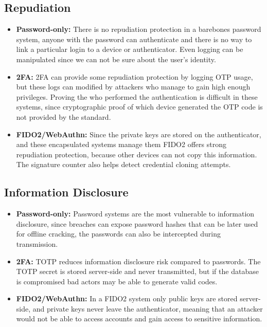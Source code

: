 {\subsection{Repudiation}
\begin{itemize}[itemsep=0pt, parsep=0pt]
    \item \textbf{Password-only:} There is no repudiation protection in a barebones password system, anyone with the password can authenticate and there is no way to link a particular login to a device or authenticator. Even logging can be manipulated since we can not be sure about the user's identity.
    \item \textbf{2FA:} 2FA can provide some repudiation protection by logging OTP usage, but these logs can modified by attackers who manage to gain high enough privileges. Proving the who performed the authentication is difficult in these systems, since cryptographic proof of which device generated the OTP code is not provided by the standard.
    \item \textbf{FIDO2/WebAuthn:} Since the private keys are stored on the authenticator, and these encapsulated systems manage them FIDO2 offers strong repudiation protection, because other devices can not copy this information. The signature counter also helps detect credential cloning attempts.
\end{itemize}

\subsection{Information Disclosure}
\begin{itemize}[itemsep=0pt, parsep=0pt]
    \item \textbf{Password-only:} Password systems are the most vulnerable to information disclosure, since breaches can expose password hashes that can be later used for offline cracking, the passwords can also be intercepted during transmission.
    \item \textbf{2FA:} TOTP reduces information disclosure risk compared to passwords. The TOTP secret is stored server-side and never transmitted, but if the database is compromised bad actors may be able to generate valid codes.
    \item \textbf{FIDO2/WebAuthn:} In a FIDO2 system only public keys are stored server-side, and private keys never leave the authenticator, meaning that an attacker would not be able to access accounts and gain access to sensitive information.
\end{itemize}

}
